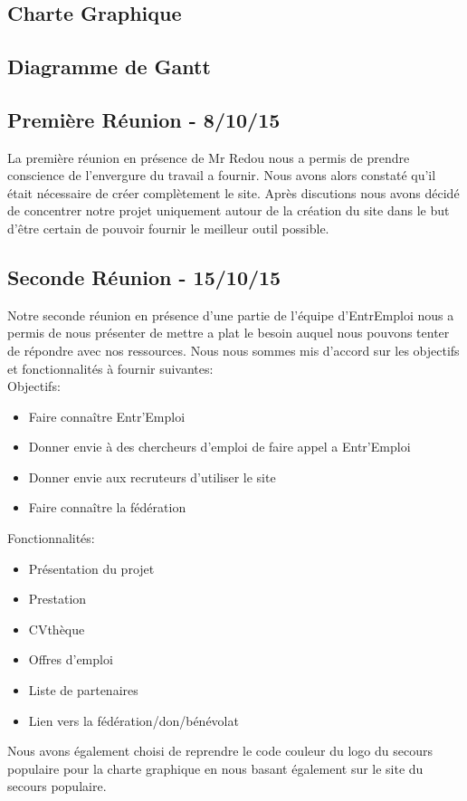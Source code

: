 \documentclass[12pt]{report}
\begin{document}
\newpage
\appendix
\chapter{}
\section{Charte Graphique}
\section{Diagramme de Gantt}
\newpage
\section{Première Réunion - 8/10/15}
La première réunion en présence de Mr Redou nous a permis de prendre conscience de l'envergure du travail a fournir. Nous avons alors constaté qu'il était nécessaire de créer complètement le site. Après discutions nous avons décidé de concentrer notre projet uniquement autour de la création du site dans le but d’être certain de pouvoir fournir le meilleur outil possible.
\section{Seconde Réunion - 15/10/15}
Notre seconde réunion en présence d'une partie de l'équipe d'EntrEmploi nous a permis de nous présenter de mettre a plat le besoin auquel nous pouvons tenter de répondre avec nos ressources. Nous nous sommes mis d'accord sur les objectifs et fonctionnalités à fournir suivantes:\\
Objectifs:
\begin{itemize}
    \item Faire connaître Entr'Emploi
    \item Donner envie à des chercheurs d'emploi de faire appel a Entr'Emploi
    \item Donner envie aux recruteurs d'utiliser le site
    \item Faire connaître la fédération
\end{itemize}
Fonctionnalités:
\begin{itemize}
    \item Présentation du projet
    \item Prestation
    \item CVthèque
    \item Offres d'emploi
    \item Liste de partenaires
    \item Lien vers la fédération/don/bénévolat
\end{itemize}
Nous avons également choisi de reprendre le code couleur du logo du secours populaire pour la charte graphique en nous basant également sur le site du secours populaire.
\end{document}
